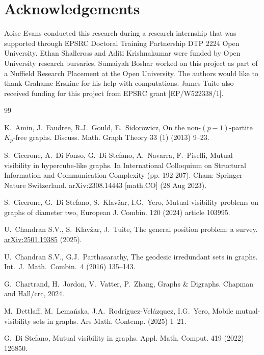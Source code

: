 \documentclass[a4paper,12pt]{article}
\theoremstyle{definition}
\begin{document}
	\section*{Acknowledgements}
	Aoise Evans conducted this research during a research internship that was supported through EPSRC Doctoral Training Partnership DTP 2224 Open University. Ethan Shallcross and Aditi Krishnakumar were funded by Open University research bursaries. Sumaiyah Boshar worked on this project as part of a Nuffield Research Placement at the Open University. The authors would like to thank Grahame Erskine for his help with computations. James Tuite also received funding for this project from EPSRC grant [EP/W522338/1].
	
	\begin{thebibliography}{99}
		
		
		K.~Amin, J.~Faudree, R.J.~Gould, E.~Sidorowicz,
		On the non-$(p-1)$-partite $K_p$-free graphs. Discuss. Math. Graph Theory 33 (1) (2013) 9--23.
		
		S.~Cicerone, A.~Di Fonso, G.~Di Stefano, A.~Navarra, F.~Piselli,
		Mutual visibility in hypercube-like graphs. 
		In International Colloquium on Structural Information and Communication Complexity (pp. 192-207). Cham: Springer Nature Switzerland. arXiv:2308.14443 [math.CO] (28 Aug 2023).
		
		S.~Cicerone, G.~Di Stefano, S.~Klav\v{z}ar, I.G.~Yero, Mutual-visibility problems on graphs of diameter two, European J. Combin. 120 (2024) article 103995.
		
		U.~Chandran S.V., S.~Klav\v{z}ar, J.~Tuite, 
		The general position problem: a survey.
		\url{arXiv:2501.19385} (2025).
		
		U.~Chandran S.V., G.J.~Parthasarathy,
		The geodesic irredundant sets in graphs.
		Int.\ J.\ Math.\ Combin.\  4 (2016) 135--143.
		
		 G.~Chartrand, H.~Jordon, V.~Vatter, P.~Zhang, Graphs \& Digraphs. Chapman and Hall/crc, 2024.
		
		 M.~Dettlaff, M.~Lema\'{n}ska, J.A.~Rodr\'{i}guez-Vel\'{a}zquez, I.G.~Yero, Mobile mutual-visibility sets in graphs. Ars Math. Contemp. (2025) 1--21.
		
		 G.~Di Stefano, Mutual visibility in graphs. Appl. Math. Comput. 419 (2022) 126850.
		

\end{thebibliography}
\end{document}
